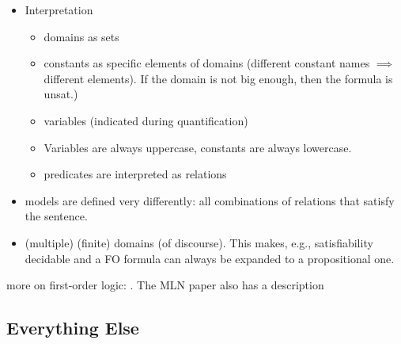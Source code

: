 
\begin{itemize}
  \item Interpretation
        \begin{itemize}
          \item domains as sets
          \item constants as specific elements of domains (different constant
                names $\implies$ different elements). If the domain is not big
                enough, then the formula is unsat.)
          \item variables (indicated during quantification)
          \item Variables are always uppercase, constants are always lowercase.
          \item predicates are interpreted as relations
        \end{itemize}
  \item models are defined very differently: all combinations of relations that
        satisfy the sentence.
  \item (multiple) (finite) domains (of discourse). This makes, e.g.,
        satisfiability decidable and a FO formula can always be expanded to a
        propositional one.
\end{itemize}

more on first-order logic: \citep{DBLP:books/daglib/0023546}. The MLN paper also
has a description

\subsection{Everything Else}

